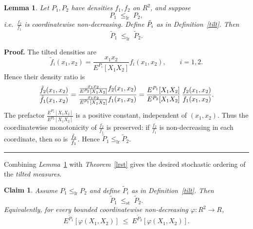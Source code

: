 \documentclass[onecolumn]{article}
\newtheorem{claim}[theorem]{Claim}
\newtheorem{lemma}[theorem]{Lemma}
\newenvironment{proof}[1][Proof]{\noindent\textbf{#1.} }{\ \rule{0.5em}{0.5em}}
\begin{document}
\begin{lemma}
\label{tilt-lr} Let $P_{1},P_{2}$ have densities $f_{1},f_{2}$ on $R^{2}$,
and suppose 
\begin{equation}
P_{1}\;\leq _{\mathrm{lr}}\;P_{2},  \label{808}
\end{equation}%
i.e.\ $\frac{f_{2}}{f_{1}}$ is coordinatewise non-decreasing. Define $\tilde{%
P}_{i}$ as in Definition~\ref{tilt}. Then 
\begin{equation}
\tilde{P}_{1}\;\leq _{\mathrm{lr}}\;\tilde{P}_{2}.  \label{809}
\end{equation}
\end{lemma}

\begin{proof}
\noindent The tilted densities are 
\begin{equation}
\tilde{f}_{i}(x_{1},x_{2})=\frac{x_{1}x_{2}}{E^{P_{i}}[X_{1}X_{2}]}%
f_{i}(x_{1},x_{2}),\qquad i=1,2.  \label{810}
\end{equation}%
Hence their density ratio is 
\begin{equation}
\frac{\tilde{f}_{2}(x_{1},x_{2})}{\tilde{f}_{1}(x_{1},x_{2})}=\frac{\frac{%
x_{1}x_{2}}{E^{P_{2}}[X_{1}X_{2}]}f_{2}(x_{1},x_{2})}{\frac{x_{1}x_{2}}{%
E^{P_{1}}[X_{1}X_{2}]}f_{1}(x_{1},x_{2})}=\frac{E^{P_{1}}[X_{1}X_{2}]}{%
E^{P_{2}}[X_{1}X_{2}]}\,\frac{f_{2}(x_{1},x_{2})}{f_{1}(x_{1},x_{2})}.
\label{811}
\end{equation}%
The prefactor $\frac{E^{P_{1}}[X_{1}X_{2}]}{E^{P_{2}}[X_{1}X_{2}]}$ is a
positive constant, independent of $(x_{1},x_{2})$. Thus the coordinatewise
monotonicity of $\frac{f_{2}}{f_{1}}$ is preserved: if $\frac{f_{2}}{f_{1}}$
is non-decreasing in each coordinate, then so is $\frac{\tilde{f}_{2}}{%
\tilde{f}_{1}}$. Hence $\tilde{P}_{1}\leq _{\mathrm{lr}}\tilde{P}_{2}$.
\hfill
\end{proof}

Combining \textit{Lemma}~\ref{tilt-lr} with \textit{Theorem}~\ref{lrst}
gives the desired stochastic ordering of the \textit{tilted measures}.

\begin{claim}
\noindent \label{tilt-st} Assume $P_{1}\leq _{\mathrm{lr}}P_{2}$ and define $%
\tilde{P}_{i}$ as in Definition~\ref{tilt}. Then 
\begin{equation}
\tilde{P}_{1}\;\leq _{\mathrm{st}}\;\tilde{P}_{2}.  \label{812}
\end{equation}%
Equivalently, for every bounded coordinatewise non-decreasing $\varphi
:R^{2}\rightarrow R$, 
\begin{equation}
E^{\tilde{P}_{1}}[\varphi (X_{1},X_{2})]\;\leq \;E^{\tilde{P}_{2}}[\varphi
(X_{1},X_{2})].  \label{813}
\end{equation}
\end{claim}
\end{document}
